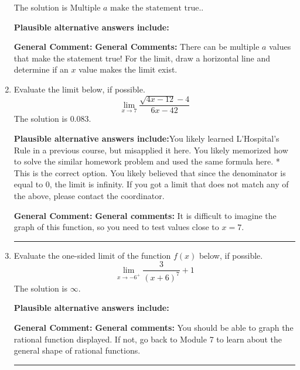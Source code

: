 \documentclass{extbook}[14pt]
\newcommand{\litem}[1]{\item #1

\rule{\textwidth}{0.4pt}}
\begin{document}
\begin{enumerate}
{The solution is \( \text{Multiple } a \text{ make the statement true}. \).\begin{enumerate}[label=\Alph*.]
\textbf{Plausible alternative answers include:}




\end{enumerate}

\textbf{General Comment:} \textbf{General Comments:} There can be multiple $a$ values that make the statement true! For the limit, draw a horizontal line and determine if an $x$ value makes the limit exist.
}
\litem{
Evaluate the limit below, if possible.
\[ \lim_{x \rightarrow 7} \frac{\sqrt{4x - 12} - 4}{6x - 42} \]The solution is \( 0.083 \).\begin{enumerate}[label=\Alph*.]
\textbf{Plausible alternative answers include:}You likely learned L'Hospital's Rule in a previous course, but misapplied it here.
You likely memorized how to solve the similar homework problem and used the same formula here.
* This is the correct option.
You likely believed that since the denominator is equal to 0, the limit is infinity.
If you got a limit that does not match any of the above, please contact the coordinator.
\end{enumerate}

\textbf{General Comment:} \textbf{General comments:} It is difficult to imagine the graph of this function, so you need to test values close to $x = 7$.
}
\litem{
Evaluate the one-sided limit of the function $f(x)$ below, if possible.
\[ \lim_{x \rightarrow -6^+} \frac{3}{(x+6)^7}+1 \]The solution is \( \infty \).\begin{enumerate}[label=\Alph*.]
\textbf{Plausible alternative answers include:}




\end{enumerate}

\textbf{General Comment:} \textbf{General comments:} You should be able to graph the rational function displayed. If not, go back to Module 7 to learn about the general shape of rational functions.
}
\end{enumerate}
\end{document}
